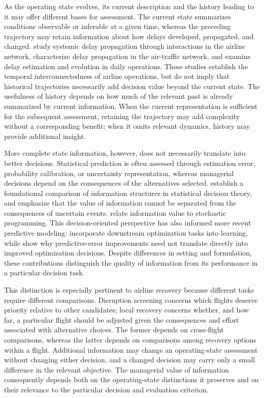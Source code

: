 As the operating state evolves, its current description and the history leading to it may offer different bases for assessment. The current state summarizes conditions observable or inferable at a given time, whereas the preceding trajectory may retain information about how delays developed, propagated, and changed. \citet{fleurquinSystemicDelayPropagation2013} study systemic delay propagation through interactions in the airline network, \citet{li2021delayNetwork} characterize delay propagation in the air-traffic network, and \citet{erdemAirlineDelayPropagation2024} examine delay estimation and evolution in daily operations. These studies establish the temporal interconnectedness of airline operations, but do not imply that historical trajectories necessarily add decision value beyond the current state. The usefulness of history depends on how much of the relevant past is already summarized by current information. When the current representation is sufficient for the subsequent assessment, retaining the trajectory may add complexity without a corresponding benefit; when it omits relevant dynamics, history may provide additional insight.

More complete state information, however, does not necessarily translate into better decisions. Statistical prediction is often assessed through estimation error, probability calibration, or uncertainty representation, whereas managerial decisions depend on the consequences of the alternatives selected. \citet{blackwellEquivalentComparisonsExperiments1953} establish a foundational comparison of information structures in statistical decision theory, and \citet{howardInformationValueTheory1966} emphasize that the value of information cannot be separated from the consequences of uncertain events. \citet{avrielWilliamsValueInformation1970} relate information value to stochastic programming. This decision-oriented perspective has also informed more recent predictive modeling: \citet{dontiTaskBasedEndtoEnd2017} incorporate downstream optimization tasks into learning, while \citet{elmachtoubGrigasSmartPredictOptimize2022} show why predictive-error improvements need not translate directly into improved optimization decisions. Despite differences in setting and formulation, these contributions distinguish the quality of information from its performance in a particular decision task.

This distinction is especially pertinent to airline recovery because different tasks require different comparisons. Disruption screening concerns which flights deserve priority relative to other candidates; local recovery concerns whether, and how far, a particular flight should be adjusted given the consequences and effort associated with alternative choices. The former depends on cross-flight comparisons, whereas the latter depends on comparisons among recovery options within a flight. Additional information may change an operating-state assessment without changing either decision, and a changed decision may carry only a small difference in the relevant objective. The managerial value of information consequently depends both on the operating-state distinctions it preserves and on their relevance to the particular decision and evaluation criterion.

